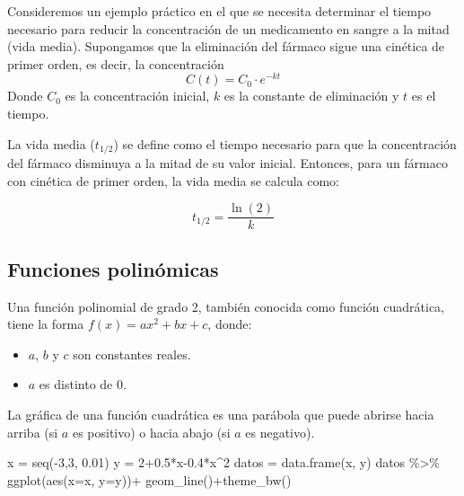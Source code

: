 \documentclass[
  letterpaper,
  DIV=11,
  numbers=noendperiod]{scrreprt}
\newenvironment{Shaded}{\begin{snugshade}}{\end{snugshade}}
\newcommand{\AttributeTok}[1]{\textcolor[rgb]{0.40,0.45,0.13}{#1}}
\newcommand{\DecValTok}[1]{\textcolor[rgb]{0.68,0.00,0.00}{#1}}
\newcommand{\FloatTok}[1]{\textcolor[rgb]{0.68,0.00,0.00}{#1}}
\newcommand{\FunctionTok}[1]{\textcolor[rgb]{0.28,0.35,0.67}{#1}}
\newcommand{\NormalTok}[1]{\textcolor[rgb]{0.00,0.23,0.31}{#1}}
\newcommand{\OtherTok}[1]{\textcolor[rgb]{0.00,0.23,0.31}{#1}}
\newcommand{\SpecialCharTok}[1]{\textcolor[rgb]{0.37,0.37,0.37}{#1}}
\providecommand{\tightlist}{%
  \setlength{\itemsep}{0pt}\setlength{\parskip}{0pt}}\usepackage{longtable,booktabs,array}
\begin{document}
Consideremos un ejemplo práctico en el que se necesita determinar el
tiempo necesario para reducir la concentración de un medicamento en
sangre a la mitad (vida media). Supongamos que la eliminación del
fármaco sigue una cinética de primer orden, es decir, la concentración
\[C(t) = C_0 \cdot e^{-kt}\] Donde \(C_0\) es la concentración inicial,
\(k\) es la constante de eliminación y \(t\) es el tiempo.

La vida media (\(t_{1/2}\)) se define como el tiempo necesario para que
la concentración del fármaco disminuya a la mitad de su valor inicial.
Entonces, para un fármaco con cinética de primer orden, la vida media se
calcula como:

\[t_{1/2} = \frac{\ln(2)}{k}\]

\subsection{Funciones polinómicas}\label{funciones-polinuxf3micas}

Una función polinomial de grado 2, también conocida como función
cuadrática, tiene la forma \(f(x) = ax^2 + bx + c\), donde:

\begin{itemize}
\tightlist
\item
  \(a\), \(b\) y \(c\) son constantes reales.
\item
  \(a\) es distinto de 0.
\end{itemize}

La gráfica de una función cuadrática es una parábola que puede abrirse
hacia arriba (si \(a\) es positivo) o hacia abajo (si \(a\) es
negativo).

\begin{Shaded}
\begin{Highlighting}[]
\NormalTok{x }\OtherTok{=} \FunctionTok{seq}\NormalTok{(}\SpecialCharTok{{-}}\DecValTok{3}\NormalTok{,}\DecValTok{3}\NormalTok{, }\FloatTok{0.01}\NormalTok{)}
\NormalTok{y }\OtherTok{=} \DecValTok{2}\FloatTok{+0.5}\SpecialCharTok{*}\NormalTok{x}\FloatTok{{-}0.4}\SpecialCharTok{*}\NormalTok{x}\SpecialCharTok{\^{}}\DecValTok{2}
\NormalTok{datos }\OtherTok{=} \FunctionTok{data.frame}\NormalTok{(x, y)}
\NormalTok{datos }\SpecialCharTok{\%\textgreater{}\%} \FunctionTok{ggplot}\NormalTok{(}\FunctionTok{aes}\NormalTok{(}\AttributeTok{x=}\NormalTok{x, }\AttributeTok{y=}\NormalTok{y))}\SpecialCharTok{+}
  \FunctionTok{geom\_line}\NormalTok{()}\SpecialCharTok{+}\FunctionTok{theme\_bw}\NormalTok{()}
\end{Highlighting}
\end{Shaded}
\end{document}
